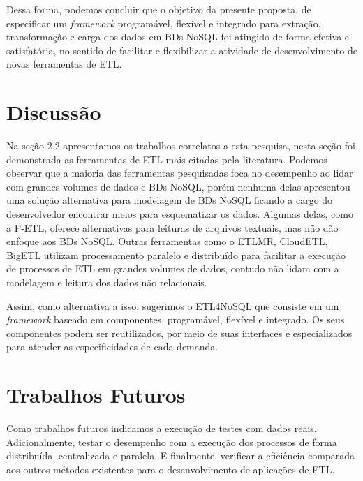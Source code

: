 Dessa forma, podemos concluir que o objetivo da presente proposta, de especificar um \textit{framework} programável, flexível e integrado para extração, transformação e carga dos dados em BDs NoSQL foi atingido de forma efetiva e satisfatória, no sentido de facilitar e flexibilizar a atividade de desenvolvimento de novas ferramentas de ETL.

\section{Discussão}

Na seção 2.2 apresentamos os trabalhos correlatos a esta pesquisa, nesta seção foi demonstrada as ferramentas de ETL mais citadas pela literatura. Podemos observar que a maioria das ferramentas pesquisadas foca no desempenho ao lidar com grandes volumes de dados e BDs NoSQL, porém nenhuma delas apresentou uma solução alternativa para modelagem de BDs NoSQL ficando a cargo do desenvolvedor encontrar meios para esquematizar os dados. Algumas delas, como a P-ETL, oferece alternativas para leituras de arquivos textuais, mas não dão enfoque aos BDs NoSQL.  Outras ferramentas como o ETLMR, CloudETL, BigETL utilizam processamento paralelo e distribuído para facilitar a execução de processos de ETL em grandes volumes de dados, contudo não lidam com a modelagem e leitura dos dados não relacionais.

Assim, como alternativa a isso, sugerimos o ETL4NoSQL que consiste em um \textit{framework} baseado em componentes, programável, flexível e integrado. Os seus componentes podem ser reutilizados, por meio de suas interfaces e especializados para atender as especificidades de cada demanda.


\section{Trabalhos Futuros}

Como trabalhos futuros indicamos a execução de testes com dados reais. Adicionalmente, testar o desempenho com a execução dos processos de forma distribuída, centralizada e paralela. E finalmente, verificar a eficiência comparada aos outros métodos existentes para o desenvolvimento de aplicações de ETL.


